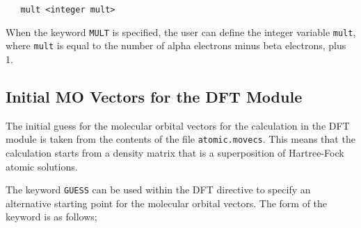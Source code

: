 \begin{verbatim}
   mult <integer mult> 
\end{verbatim}

When the keyword \verb+MULT+ is specified, the user can define the integer
variable \verb+mult+, where \verb+mult+ is equal to the number of alpha 
electrons minus beta electrons, plus 1.

%
% 

\subsection{Initial MO Vectors for the DFT Module}


The initial guess for the molecular orbital vectors for the calculation
in the DFT module is taken from the contents of the file {\tt atomic.movecs}.
This  means that the calculation starts from a density matrix that is
a superposition of Hartree-Fock atomic solutions.

The keyword \verb+GUESS+ can be used within the DFT directive to specify
an alternative starting point for the molecular orbital vectors.  The form
of the keyword is as follows;

